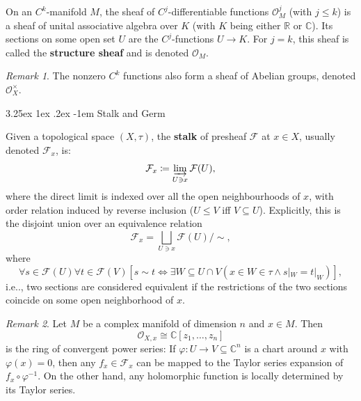 \documentclass[12pt, letterpaper]{article}
\makeatletter
\newcommand{\re}{\mathbb{R}}
\newcommand{\co}{\mathbb{C}}
\newcommand\ie{i.e\@ifnextchar.{}{.\@}}
\newcommand{\define}{\coloneqq}
\renewcommand\paragraph{\@startsection{paragraph}{4}{\z@}%
	{3.25ex \@plus1ex \@minus.2ex}%
	{-1em}%
	{\normalfont\normalsize\bfseries}}
\theoremstyle{definition}
\theoremstyle{remark}
\newtheorem*{rem*}{Remark}
\theoremstyle{definition}
\theoremstyle{plain}
\numberwithin{equation}{section}
\makeatother
\begin{document}
	\begin{def*}
		On an $C^k$-manifold $M$, the sheaf of $C^j$-differentiable functions ${\mathcal {O}}_{M}^{j}$ (with $j \le k$)
		is a sheaf of unital associative algebra over $K$  (with $K$ being either $\re$ or $\co$).
		Its sections on some open set $U$ are the $C^j$-functions $U \to K$.
		For $j = k$, this sheaf is called the \textbf{structure sheaf} and is denoted $\mathcal {O}_{M}$.
	\end{def*}
	\begin{rem*}
		The nonzero $C^k$ functions also form a sheaf of Abelian groups, denoted $ {\mathcal {O}}_{X}^{\times }$.
		
		
	\end{rem*}

	\paragraph{Stalk and Germ}

	\begin{def*}[stalk]
		Given a topological space $(X,\tau)$,
		the \textbf{stalk} of presheaf ${\mathcal{F}}$ at $x\in X$, usually denoted ${\mathcal {F}}_{x}$, is:
		\[{\mathcal  {F}}_{x}\define\varinjlim _{{U\ni x}}{\mathcal  {F}}(U),\]
		where the direct limit is indexed over all the open neighbourhoods of $x$,
		with order relation induced by reverse inclusion ($U\le V$ iff $V\subseteq U $).
		Explicitly, this is the disjoint union over an equivalence relation
		\[ \mathcal{F}_x = \bigsqcup _{U\ni x}\mathcal{F}(U){\bigg /}\sim , \]
		where
		\[ \forall s\in\mathcal{F}(U) \forall t\in \mathcal{F}(V)
		[s\sim t \iff \exists W\subseteq U\cap V (x\in W\in \tau\land s|_{W}=t|_{W}) ],
		\]
		\ie, two sections are considered equivalent if the restrictions of the two sections
		coincide on some open neighborhood of $x$.
	\end{def*}
	\begin{rem*}
		Let $M$ be a complex manifold of dimension $n$ and
		$x \in M$. Then
		\[\mathcal{O}_{X,x} \cong \co[z_1, \dots , z_n]\]
		is the ring of convergent power series: If $\varphi \colon U \to V \subseteq \co^n$
		is a chart around $x$ with $\varphi(x) = 0$, then any $f_x \in \mathcal{F}_x$ can be mapped
		to the Taylor series expansion of $f_x \circ \varphi^{-1}$.
		On the other hand, any
		holomorphic function is locally determined by its Taylor series.
	\end{rem*}
\end{document}
